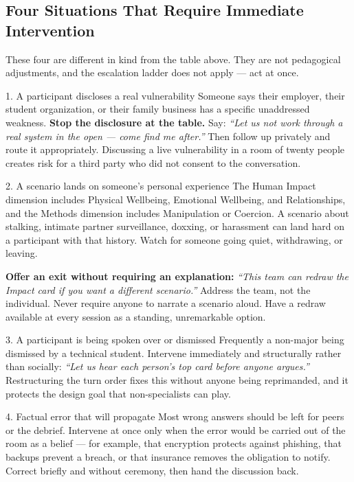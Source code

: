 \documentclass[11pt,letterpaper]{article}
\newcommand{\say}[1]{\textit{``#1''}}
\begin{document}
\subsection{Four Situations That Require Immediate Intervention}

These four are different in kind from the table above. They are not pedagogical
adjustments, and the escalation ladder does not apply --- act at once.

\begin{intervene}{1. A participant discloses a real vulnerability}
Someone says their employer, their student organization, or their family
business has a specific unaddressed weakness. \textbf{Stop the disclosure at the
table.} Say: \say{Let us not work through a real system in the open --- come
find me after.} Then follow up privately and route it appropriately. Discussing
a live vulnerability in a room of twenty people creates risk for a third party
who did not consent to the conversation.
\end{intervene}

\begin{intervene}{2. A scenario lands on someone's personal experience}
The Human Impact dimension includes Physical Wellbeing, Emotional Wellbeing, and
Relationships, and the Methods dimension includes Manipulation or Coercion. A
scenario about stalking, intimate partner surveillance, doxxing, or harassment
can land hard on a participant with that history. Watch for someone going quiet,
withdrawing, or leaving.

\textbf{Offer an exit without requiring an explanation:} \say{This team can
redraw the Impact card if you want a different scenario.} Address the team, not
the individual. Never require anyone to narrate a scenario aloud. Have a
redraw available at every session as a standing, unremarkable option.
\end{intervene}

\begin{intervene}{3. A participant is being spoken over or dismissed}
Frequently a non-major being dismissed by a technical student. Intervene
immediately and structurally rather than socially: \say{Let us hear each person's
top card before anyone argues.} Restructuring the turn order fixes this without
anyone being reprimanded, and it protects the design goal that non-specialists
can play.
\end{intervene}

\begin{intervene}{4. Factual error that will propagate}
Most wrong answers should be left for peers or the debrief. Intervene at once
only when the error would be carried out of the room as a belief --- for
example, that encryption protects against phishing, that backups prevent a
breach, or that insurance removes the obligation to notify. Correct briefly and
without ceremony, then hand the discussion back.
\end{intervene}
\end{document}
